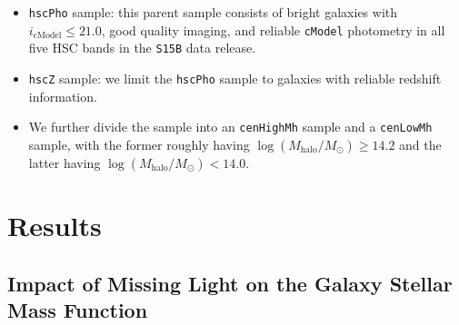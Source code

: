 \documentclass[a4paper,fleqn,usenatbib]{mnras}
\def\redm{\texttt{redMaPPer}}
\def\rbcg{\texttt{cenHighMh}}
\def\nbcg{\texttt{cenLowMh}}
\def\mstar{{$M_{\star}$}}
\def\logmh{{$\log (M_{\mathrm{halo}}/M_{\odot})$}}
\begin{document}
    \begin{itemize}
        \item \texttt{hscPho} sample: this parent sample consists of bright galaxies 
            with $i_{\mathrm{cModel}} \leq 21.0$, good quality imaging, and reliable 
            \texttt{cModel} photometry in all five HSC bands in the \texttt{S15B} 
            data release. 
        \item \texttt{hscZ} sample: we limit the \texttt{hscPho} sample to galaxies 
            with reliable redshift information. 
        \item We further divide the sample into an \rbcg{} sample and a \nbcg{} sample, 
          with the former roughly having \logmh{}$\geq 14.2$ and the latter having 
           \logmh{}$<14.0$.

    \end{itemize}
    


 
\section{Results}
    \label{sec:result}

    \subsection{Impact of Missing Light on the Galaxy Stellar Mass Function}
    \label{ssec:s82}
    
\end{document}
